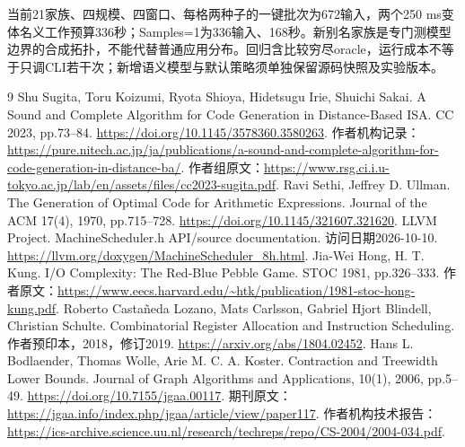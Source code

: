 \documentclass[UTF8,11pt,fontset=fandol]{ctexart}
\begin{document}
当前21家族、四规模、四窗口、每格两种子的一键批次为672输入，两个250 ms变体名义工作预算336秒；Samples=1为336输入、168秒。新别名家族是专门测模型边界的合成拓扑，不能代替普通应用分布。回归含比较穷尽oracle，运行成本不等于只调CLI若干次；新增语义模型与默认策略须单独保留源码快照及实验版本。

\begin{thebibliography}{9}
 Shu Sugita, Toru Koizumi, Ryota Shioya, Hidetsugu Irie, Shuichi Sakai. A Sound and Complete Algorithm for Code Generation in Distance-Based ISA. CC 2023, pp.73--84. \url{https://doi.org/10.1145/3578360.3580263}. 作者机构记录：\url{https://pure.nitech.ac.jp/ja/publications/a-sound-and-complete-algorithm-for-code-generation-in-distance-ba/}. 作者组原文：\url{https://www.rsg.ci.i.u-tokyo.ac.jp/lab/en/assets/files/cc2023-sugita.pdf}.
 Ravi Sethi, Jeffrey D. Ullman. The Generation of Optimal Code for Arithmetic Expressions. Journal of the ACM 17(4), 1970, pp.715--728. \url{https://doi.org/10.1145/321607.321620}.
 LLVM Project. MachineScheduler.h API/source documentation. 访问日期2026-10-10. \url{https://llvm.org/doxygen/MachineScheduler_8h.html}.
 Jia-Wei Hong, H. T. Kung. I/O Complexity: The Red-Blue Pebble Game. STOC 1981, pp.326--333. 作者原文：\url{https://www.eecs.harvard.edu/~htk/publication/1981-stoc-hong-kung.pdf}.
 Roberto Casta\~neda Lozano, Mats Carlsson, Gabriel Hjort Blindell, Christian Schulte. Combinatorial Register Allocation and Instruction Scheduling. 作者预印本，2018，修订2019. \url{https://arxiv.org/abs/1804.02452}.
 Hans L. Bodlaender, Thomas Wolle, Arie M. C. A. Koster. Contraction and Treewidth Lower Bounds. Journal of Graph Algorithms and Applications, 10(1), 2006, pp.5--49. \url{https://doi.org/10.7155/jgaa.00117}. 期刊原文：\url{https://jgaa.info/index.php/jgaa/article/view/paper117}. 作者机构技术报告：\url{https://ics-archive.science.uu.nl/research/techreps/repo/CS-2004/2004-034.pdf}.
\end{thebibliography}
\end{document}

